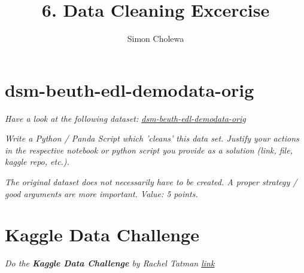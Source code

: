 \documentclass[11pt,a4paper]{article}
\author{Simon Cholewa}
\title{6. Data Cleaning Excercise}
\begin{document}
\maketitle

\section{dsm-beuth-edl-demodata-orig}

\textit{Have a look at the following dataset: \hyperref{https://github.com/edlich/eternalrepo/blob/master/DS-WAHLFACH/dsm-beuth-edl-demodata-dirty.csv}{}{}{dsm-beuth-edl-demodata-orig}}

\textit{Write a Python / Panda Script which 'cleans' this data set. Justify your actions in the respective notebook or python script you provide as a solution (link, file, kaggle repo, etc.).}

\textit{The original dataset does not necessarily have to be created. A proper strategy / good arguments are more important. Value: 5 points.}




\section{Kaggle Data Challenge}

\textit{Do the \textbf{Kaggle Data Challenge} by Rachel Tatman \hyperref{https://mailchi.mp/kaggle.com/5-day-data-challenge-data-cleaning-day-1?e=08afe8bf5d}{}{}{link}}
\end{document}
